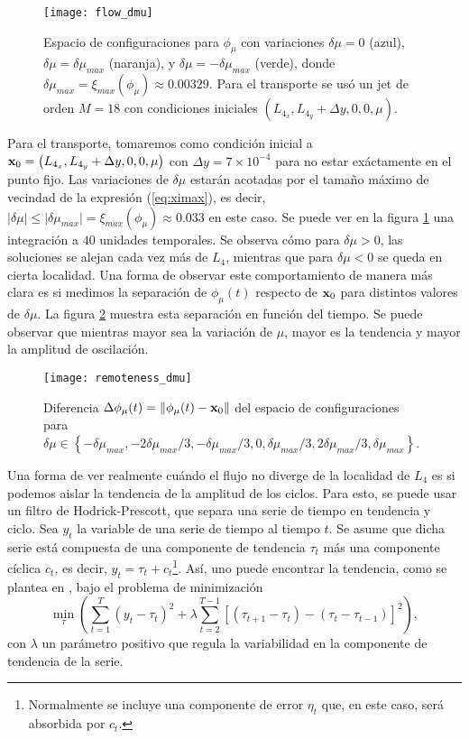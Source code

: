 \begin{figure}
 \centering
 \texttt{[image: flow\_dmu]}
 \caption{Espacio de configuraciones para $\phi_\mu$ con variaciones $\delta\mu = 0$ (azul), $\delta\mu = \delta\mu_{max}$ (naranja), y $\delta\mu = -\delta\mu_{max}$ (verde), donde $\delta\mu_{max} = \xi_{max}(\phi_\mu) \approx 0.00329$. Para el transporte se usó un jet de orden $M=18$ con condiciones iniciales $\left( L_{4_x}, L_{4_y} + \Delta y, 0, 0, \mu \right)$.}
 \label{fig:flow_dmu}
\end{figure}

Para el transporte, tomaremos como condición inicial a $\mathbf{x}_0 = \left( L_{4_x}, L_{4_y} + \Delta y, 0, 0, \mu \right)$ con $\Delta y = 7\times 10^{-4}$ para no estar exáctamente en el punto fijo. Las variaciones de $\delta\mu$ estarán acotadas por el tamaño máximo de vecindad de la expresión (\ref{eq:ximax}), es decir, $\lvert \delta\mu \rvert \leq \lvert \delta\mu_{max} \rvert = \xi_{max}(\phi_\mu) \approx 0.033$ en este caso. Se puede ver en la figura \ref{fig:flow_dmu} una integración a $40$ unidades temporales. Se observa cómo para $\delta \mu > 0$, las soluciones se alejan cada vez más de $L_4$, mientras que para $\delta \mu < 0$ se queda en cierta localidad. Una forma de observar este comportamiento de manera más clara es si medimos la separación de $\phi_\mu(t)$ respecto de $\mathbf{x}_0$ para distintos valores de $\delta \mu$. La figura \ref{fig:remoteness_dmu} muestra esta separación en función del tiempo. Se puede observar que mientras mayor sea la variación de $\mu$, mayor es la tendencia y mayor la amplitud de oscilación. 

\begin{figure}
 \centering
 \texttt{[image: remoteness\_dmu]}
 \caption{Diferencia $\Delta\phi_\mu(t) = \left\lVert \phi_\mu(t) - \mathbf{x}_0 \right\rVert$ del espacio de configuraciones para $\delta\mu \in \left\lbrace -\delta\mu_{max}, -2\delta\mu_{max}/3, -\delta\mu_{max}/3, 0, \delta\mu_{max}/3, 2\delta\mu_{max}/3, \delta\mu_{max}  \right\rbrace$.}
 \label{fig:remoteness_dmu}
\end{figure}

Una forma de ver realmente cuándo el flujo no diverge de la localidad de $L_4$ es si podemos aislar la tendencia de la amplitud de los ciclos. Para esto, se puede usar un filtro de Hodrick-Prescott, que separa una serie de tiempo en tendencia y ciclo. Sea $y_t$ la variable de una serie de tiempo al tiempo $t$. Se asume que dicha serie está compuesta de una componente de tendencia $\tau_t$ más una componente cíclica $c_t$, es decir, $y_t = \tau_t + c_t$\footnote{Normalmente se incluye una componente de error $\eta_t$ que, en este caso, será absorbida por $c_t$.}. Así, uno puede encontrar la tendencia, como se plantea en \cite{Hodrick1997}, bajo el problema de minimización
\begin{equation}
 \min_{\tau} \left( \sum_{t=1}^T (y_t - \tau_t)^2 + \lambda \sum_{t=2}^{T-1} \left[ (\tau_{t+1} - \tau_t) - (\tau_t - \tau_{t-1}) \right]^2 \right),
 \label{eq:hp-filter}
\end{equation} 
con $\lambda$ un parámetro positivo que regula la variabilidad en la componente de tendencia de la serie.

